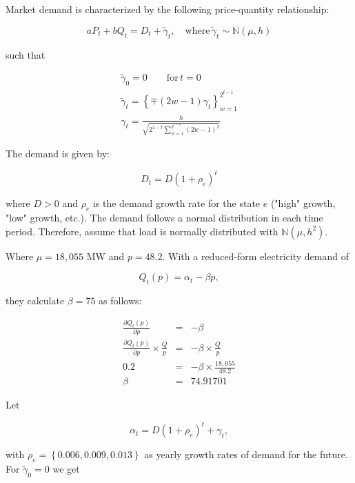 Market demand is characterized by the following price-quantity relationship:

\begin{equation}
  \label{eq:marketdemandpq}
  aP_t+bQ_t=D_t+\tilde{\gamma}_t, \quad \mbox{where}\, \tilde{\gamma}_t\sim\mathbb{N}(\mu,h)
\end{equation}

such that

\begin{eqnarray*}
  \label{eq:3}
  \tilde{\gamma}_0=0\qquad\mbox{for}\, t=0\\
   \tilde{\gamma}_t=\left\{\mp(2w-1)\gamma_t\right\}_{w=1}^{2^{t-1}}\\
   \gamma_t=\frac{h}{\sqrt{2^{1-t}\sum_{w=1}^{2^{t-1}}(2w-1)^2}}
\end{eqnarray*}

The demand is given by:

\begin{equation}
  \label{eq:demandgrowth}
  D_t = D(1+\rho_e)^t
\end{equation}

where $D>0$ and $\rho_e$ is the demand growth rate for the state $e$ ("high" growth, "low" growth, etc.). The demand follows a normal distribution in each time period. Therefore, \cite{Genc2008} assume that load is normally distributed with $\mathbb{N}(\mu, h^2)$.

Where $\mu=18,055$ MW and $p=48.2$. With a reduced-form electricity demand of

\begin{equation}
  \label{eq:5}
  Q_t(p) = \alpha_t-\beta p, 
\end{equation}

they calculate $\beta=75$ as follows:

\begin{eqnarray*}
  \frac{\partial Q_t(p)}{\partial p} &=& -\beta \\
  \frac{\partial Q_t(p)}{\partial p}\times\frac{Q}{p} &=& -\beta\times\frac{Q}{p} \\
  0.2 &=& -\beta\times\frac{18,055}{48.2}\\
\beta &=& 74.91701
\end{eqnarray*}


Let

\begin{equation*}
  \alpha_t=D(1+\rho_e)^t+\gamma_t,
\end{equation*}

with $\rho_e = \left\{0.006, 0.009, 0.013\right\}$ as yearly growth rates of demand for the future. For $\tilde{\gamma}_0=0$ we get

